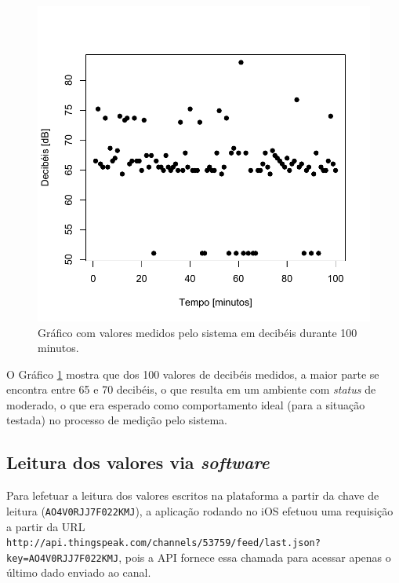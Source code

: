 \documentclass[
    12pt,               %
    openright,          %
    oneside,
    a4paper,            
    english,            %
    brazil              %
    ]{abntex2}
\begin{document}
\begin{figure}[!htb]
  \begin{center}
    \caption{\label{erre}Gráfico com valores medidos pelo sistema em decibéis durante 100 minutos.}
    \includegraphics[scale=0.56]{images/Rplot.pdf}
  \end{center}
\end{figure}

O Gráfico \ref{erre} mostra que dos 100 valores de decibéis medidos, a maior parte se encontra entre 65 e 70 decibéis, o que resulta em um ambiente com \textit{status} de moderado, o que era esperado como comportamento ideal (para a situação testada) no processo de medição pelo sistema. 

\subsection{Leitura dos valores via \textit{software}}\label{soft}

Para lefetuar a leitura dos valores escritos na plataforma a partir da chave de leitura (\texttt{AO4V0RJJ7F022KMJ}), a aplicação rodando no iOS efetuou uma requisição a partir da URL \small{\texttt{http://api.thingspeak.com/channels/53759/feed/last.json?key=AO4V0RJJ7F022KMJ}}, pois a API fornece essa chamada para acessar apenas o último dado enviado ao canal.
\end{document}
